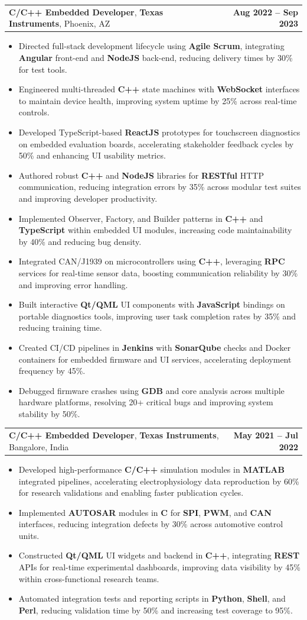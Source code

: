 \documentclass[letterpaper,11pt]{article}
\makeatletter
\newcommand{\resumeItem}[1]{
  \item\footnotesize{
    {#1 \vspace{-2pt}}
  }
}
\newcommand{\resumeSubheading}[4]{
  \vspace{-2pt}\item
    \begin{tabular*}{1.0\textwidth}[t]{l@{\extracolsep{\fill}}r}
      \textbf{\fontsize{10pt}{14pt}\selectfont #3}, \textbf{\fontsize{10pt}{14pt}\selectfont #1}, \fontsize{10pt}{14pt}\selectfont #4 & \textbf{\fontsize{10pt}{14pt}\selectfont #2} \\
    \end{tabular*}\vspace{-7pt}
}
\newcommand{\resumeItemListStart}{\begin{itemize}[leftmargin=*]}
\newcommand{\resumeItemListEnd}{\end{itemize}\vspace{-5pt}}
\makeatother
\begin{document}
    \resumeSubheading
        {Texas Instruments}{Aug 2022 -- Sep 2023}
        {C/C++ Embedded Developer}{Phoenix, AZ}
      \resumeItemListStart
        \resumeItem{Directed full-stack development lifecycle using \textbf{Agile Scrum}, integrating \textbf{Angular} front-end and \textbf{NodeJS} back-end, reducing delivery times by 30\% for test tools.}
        \resumeItem{Engineered multi-threaded \textbf{C++} state machines with \textbf{WebSocket} interfaces to maintain device health, improving system uptime by 25\% across real-time controls.}
        \resumeItem{Developed TypeScript-based \textbf{ReactJS} prototypes for touchscreen diagnostics on embedded evaluation boards, accelerating stakeholder feedback cycles by 50\% and enhancing UI usability metrics.}
        \resumeItem{Authored robust \textbf{C++} and \textbf{NodeJS} libraries for \textbf{RESTful} HTTP communication, reducing integration errors by 35\% across modular test suites and improving developer productivity.}
        \resumeItem{Implemented Observer, Factory, and Builder patterns in \textbf{C++} and \textbf{TypeScript} within embedded UI modules, increasing code maintainability by 40\% and reducing bug density.}
        \resumeItem{Integrated CAN/J1939 on microcontrollers using \textbf{C++}, leveraging \textbf{RPC} services for real-time sensor data, boosting communication reliability by 30\% and improving error handling.}
        \resumeItem{Built interactive \textbf{Qt/QML} UI components with \textbf{JavaScript} bindings on portable diagnostics tools, improving user task completion rates by 35\% and reducing training time.}
        \resumeItem{Created CI/CD pipelines in \textbf{Jenkins} with \textbf{SonarQube} checks and Docker containers for embedded firmware and UI services, accelerating deployment frequency by 45\%.}
        \resumeItem{Debugged firmware crashes using \textbf{GDB} and core analysis across multiple hardware platforms, resolving 20+ critical bugs and improving system stability by 50\%.}
      \resumeItemListEnd

    \resumeSubheading
        {Texas Instruments}{May 2021 -- Jul 2022}
        {C/C++ Embedded Developer}{Bangalore, India}
      \resumeItemListStart
        \resumeItem{Developed high-performance \textbf{C/C++} simulation modules in \textbf{MATLAB} integrated pipelines, accelerating electrophysiology data reproduction by 60\% for research validations and enabling faster publication cycles.}
        \resumeItem{Implemented \textbf{AUTOSAR} modules in \textbf{C} for \textbf{SPI}, \textbf{PWM}, and \textbf{CAN} interfaces, reducing integration defects by 30\% across automotive control units.}
        \resumeItem{Constructed \textbf{Qt/QML} UI widgets and backend in \textbf{C++}, integrating \textbf{REST} APIs for real-time experimental dashboards, improving data visibility by 45\% within cross-functional research teams.}
        \resumeItem{Automated integration tests and reporting scripts in \textbf{Python}, \textbf{Shell}, and \textbf{Perl}, reducing validation time by 50\% and increasing test coverage to 95\%.}
      \resumeItemListEnd
\end{document}

